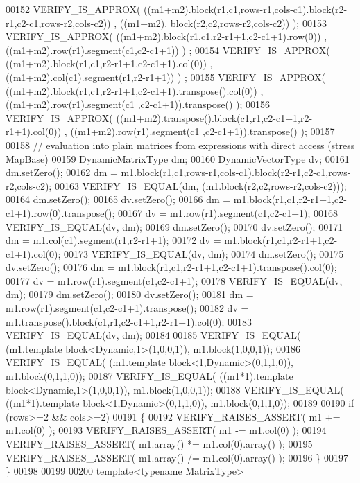 \begin{DoxyCode}
00152   VERIFY\_IS\_APPROX( ((m1+m2).block(r1,c1,rows-r1,cols-c1).block(r2-r1,c2-c1,rows-r2,cols-c2)) , ((m1+m2).
      block(r2,c2,rows-r2,cols-c2)) );
00153   VERIFY\_IS\_APPROX( ((m1+m2).block(r1,c1,r2-r1+1,c2-c1+1).row(0)) , ((m1+m2).row(r1).segment(c1,c2-c1+1)) )
      ;
00154   VERIFY\_IS\_APPROX( ((m1+m2).block(r1,c1,r2-r1+1,c2-c1+1).col(0)) , ((m1+m2).col(c1).segment(r1,r2-r1+1)) )
      ;
00155   VERIFY\_IS\_APPROX( ((m1+m2).block(r1,c1,r2-r1+1,c2-c1+1).transpose().col(0)) , ((m1+m2).row(r1).segment(c1
      ,c2-c1+1)).transpose() );
00156   VERIFY\_IS\_APPROX( ((m1+m2).transpose().block(c1,r1,c2-c1+1,r2-r1+1).col(0)) , ((m1+m2).row(r1).segment(c1
      ,c2-c1+1)).transpose() );
00157 
00158   \textcolor{comment}{// evaluation into plain matrices from expressions with direct access (stress MapBase)}
00159   DynamicMatrixType dm;
00160   DynamicVectorType dv;
00161   dm.setZero();
00162   dm = m1.block(r1,c1,rows-r1,cols-c1).block(r2-r1,c2-c1,rows-r2,cols-c2);
00163   VERIFY\_IS\_EQUAL(dm, (m1.block(r2,c2,rows-r2,cols-c2)));
00164   dm.setZero();
00165   dv.setZero();
00166   dm = m1.block(r1,c1,r2-r1+1,c2-c1+1).row(0).transpose();
00167   dv = m1.row(r1).segment(c1,c2-c1+1);
00168   VERIFY\_IS\_EQUAL(dv, dm);
00169   dm.setZero();
00170   dv.setZero();
00171   dm = m1.col(c1).segment(r1,r2-r1+1);
00172   dv = m1.block(r1,c1,r2-r1+1,c2-c1+1).col(0);
00173   VERIFY\_IS\_EQUAL(dv, dm);
00174   dm.setZero();
00175   dv.setZero();
00176   dm = m1.block(r1,c1,r2-r1+1,c2-c1+1).transpose().col(0);
00177   dv = m1.row(r1).segment(c1,c2-c1+1);
00178   VERIFY\_IS\_EQUAL(dv, dm);
00179   dm.setZero();
00180   dv.setZero();
00181   dm = m1.row(r1).segment(c1,c2-c1+1).transpose();
00182   dv = m1.transpose().block(c1,r1,c2-c1+1,r2-r1+1).col(0);
00183   VERIFY\_IS\_EQUAL(dv, dm);
00184 
00185   VERIFY\_IS\_EQUAL( (m1.template block<Dynamic,1>(1,0,0,1)), m1.block(1,0,0,1));
00186   VERIFY\_IS\_EQUAL( (m1.template block<1,Dynamic>(0,1,1,0)), m1.block(0,1,1,0));
00187   VERIFY\_IS\_EQUAL( ((m1*1).\textcolor{keyword}{template} block<Dynamic,1>(1,0,0,1)), m1.block(1,0,0,1));
00188   VERIFY\_IS\_EQUAL( ((m1*1).\textcolor{keyword}{template} block<1,Dynamic>(0,1,1,0)), m1.block(0,1,1,0));
00189 
00190   \textcolor{keywordflow}{if} (rows>=2 && cols>=2)
00191   \{
00192     VERIFY\_RAISES\_ASSERT( m1 += m1.col(0) );
00193     VERIFY\_RAISES\_ASSERT( m1 -= m1.col(0) );
00194     VERIFY\_RAISES\_ASSERT( m1.array() *= m1.col(0).array() );
00195     VERIFY\_RAISES\_ASSERT( m1.array() /= m1.col(0).array() );
00196   \}
00197 \}
00198 
00199 
00200 \textcolor{keyword}{template}<\textcolor{keyword}{typename} MatrixType>

\end{DoxyCode}
